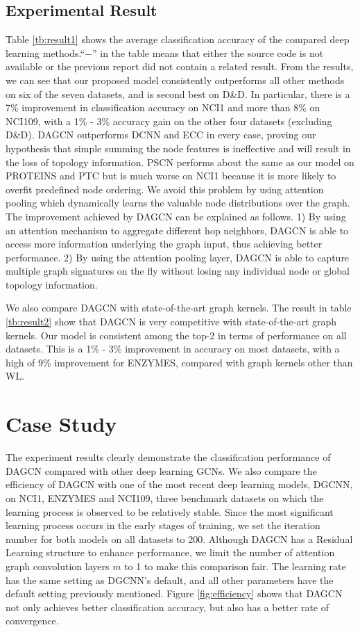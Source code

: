 \documentclass[conference]{IEEEtran}
\begin{document}
	\subsection{Experimental Result} Table \ref{tb:result1} shows the average classification accuracy of the compared deep learning methods.``$-$'' in the table means that either the source code is not available or the previous report did not contain a related result. From the results, we can see that our proposed model consistently outperforms all other methods on six of the seven datasets, and is second best on D\&D. In particular, there is a 7\% improvement in classification accuracy on NCI1 and more than 8\% on NCI109, with a 1\% - 3\% accuracy gain on the other four datasets (excluding D\&D). DAGCN outperforms DCNN and ECC in every case, proving our hypothesis that simple summing the node features is ineffective and will result in the loss of topology information. PSCN performs about the same as our model on PROTEINS and PTC but is much worse on NCI1 because it is more likely to overfit predefined node ordering. We avoid this problem by using attention pooling which dynamically learns the valuable node distributions over the graph. The improvement achieved by DAGCN can be explained as follows. 1) By using an attention mechanism to aggregate different hop neighbors, DAGCN is able to access more information underlying the graph input, thus achieving better performance. 2) By using the attention pooling layer, DAGCN is able to capture multiple graph signatures on the fly without losing any individual node or global topology information. 
	
	We also compare DAGCN with state-of-the-art graph kernels. The result in table \ref{tb:result2} show that DAGCN is very competitive with state-of-the-art graph kernels. Our model is consistent among the top-2 in terms of performance on all datasets. This is a 1\% - 3\% improvement in accuracy on most datasets, with a high of 9\% improvement for ENZYMES, compared with graph kernels other than WL.
    
	\section{Case Study}
	The experiment results clearly demonstrate the classification performance of DAGCN compared with other deep learning GCNs. We also compare the efficiency of DAGCN with one of the most recent deep learning models, DGCNN, on NCI1, ENZYMES and NCI109, three benchmark datasets on which the learning process is observed to be relatively stable. Since the most significant learning process occurs in the early stages of training, we set the iteration number for both models on all datasets to 200. Although DAGCN has a Residual Learning structure to enhance performance, we limit the number of attention graph convolution layers $m$ to 1 to make this comparison fair. The learning rate has the same setting as DGCNN's default, and all other parameters have the default setting previously mentioned. Figure \ref{fig:efficiency} shows that DAGCN not only achieves better classification accuracy, but also has a better rate of convergence.
	
\end{document}
